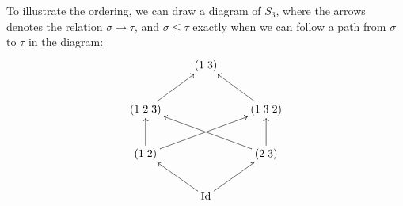 To illustrate the ordering, we can draw a diagram of $S_3$, where the
arrows denotes the relation $\sigma\to\tau$, and $\sigma\leq\tau$
exactly when we can follow a path from $\sigma$ to $\tau$ in the
diagram:
\[ \xymatrix{
  & (1\; 3) & \\
  (1\; 2\; 3)\ar[ur] & & (1\; 3\; 2)\ar[ul] \\
  (1\; 2)\ar[u]\ar[urr] & & (2\; 3) \ar[ull]\ar[u] \\
  & \Id \ar[ul] \ar[ur] &} \]

